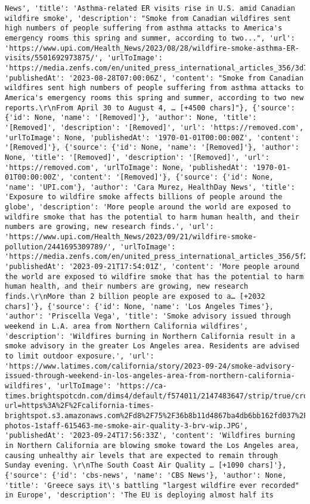 \documentclass[
  letterpaper,
  DIV=11,
  numbers=noendperiod]{scrartcl}
\begin{document}
\begin{verbatim}
News', 'title': 'Asthma-related ER visits rise in U.S. amid Canadian wildfire smoke', 'description': "Smoke from Canadian wildfires sent high numbers of people suffering from asthma attacks to America's emergency rooms this spring and summer, according to two...", 'url': 'https://www.upi.com/Health_News/2023/08/28/wildfire-smoke-asthma-ER-visits/5501692973875/', 'urlToImage': 'https://media.zenfs.com/en/united_press_international_articles_356/3d734d9869ecafe1209a79f74272150c', 'publishedAt': '2023-08-28T07:00:06Z', 'content': "Smoke from Canadian wildfires sent high numbers of people suffering from asthma attacks to America's emergency rooms this spring and summer, according to two new reports.\r\nFrom April 30 to August 4, … [+4500 chars]"}, {'source': {'id': None, 'name': '[Removed]'}, 'author': None, 'title': '[Removed]', 'description': '[Removed]', 'url': 'https://removed.com', 'urlToImage': None, 'publishedAt': '1970-01-01T00:00:00Z', 'content': '[Removed]'}, {'source': {'id': None, 'name': '[Removed]'}, 'author': None, 'title': '[Removed]', 'description': '[Removed]', 'url': 'https://removed.com', 'urlToImage': None, 'publishedAt': '1970-01-01T00:00:00Z', 'content': '[Removed]'}, {'source': {'id': None, 'name': 'UPI.com'}, 'author': 'Cara Murez, HealthDay News', 'title': 'Exposure to wildfire smoke affects billions of people around the globe', 'description': 'More people around the world are exposed to wildfire smoke that has the potential to harm human health, and their numbers are growing, new research finds.', 'url': 'https://www.upi.com/Health_News/2023/09/21/wildfire-smoke-pollution/2441695309789/', 'urlToImage': 'https://media.zenfs.com/en/united_press_international_articles_356/5f237e2bb9ee667174db2baa87833994', 'publishedAt': '2023-09-21T17:54:01Z', 'content': 'More people around the world are exposed to wildfire smoke that has the potential to harm human health, and their numbers are growing, new research finds.\r\nMore than 2 billion people are exposed to a… [+2032 chars]'}, {'source': {'id': None, 'name': 'Los Angeles Times'}, 'author': 'Priscella Vega', 'title': 'Smoke advisory issued through weekend in L.A. area from Northern California wildfires', 'description': 'Wildfires burning in Northern California result in a smoke advisory in the greater Los Angeles area. Residents are advised to limit outdoor exposure.', 'url': 'https://www.latimes.com/california/story/2023-09-24/smoke-advisory-issued-through-weekend-in-los-angeles-area-from-northern-california-wildfires', 'urlToImage': 'https://ca-times.brightspotcdn.com/dims4/default/f574011/2147483647/strip/true/crop/3526x1851+0+250/resize/1200x630!/quality/75/?url=https%3A%2F%2Fcalifornia-times-brightspot.s3.amazonaws.com%2Fd8%2F75%2F36b8b11d4867ba4db6bb162fd037%2Fla-photos-1staff-615463-me-smoke-air-quality-3-brv-wip.JPG', 'publishedAt': '2023-09-24T17:56:33Z', 'content': 'Wildfires burning in Northern California are blowing smoke toward the Los Angeles area, causing unhealthy air levels that are expected to remain through Sunday evening. \r\nThe South Coast Air Quality … [+1090 chars]'}, {'source': {'id': 'cbs-news', 'name': 'CBS News'}, 'author': None, 'title': 'Greece says it\'s battling "largest wildfire ever recorded" in Europe', 'description': 'The EU is deploying almost half its 
\end{verbatim}
\end{document}
